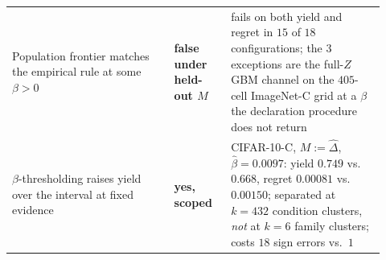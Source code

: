 \begin{center}
\begin{tabular}{@{}p{0.40\linewidth}p{0.14\linewidth}p{0.38\linewidth}@{}}
Population frontier matches the empirical rule at some $\beta>0$ & \textbf{false under held-out $M$} & fails on both yield and regret in $15$ of $18$ configurations; the $3$ exceptions are the full-$Z$ GBM channel on the $405$-cell ImageNet-C grid at a $\beta$ the declaration procedure does not return \\
$\beta$-thresholding raises yield over the interval at fixed evidence & \textbf{yes, scoped} & CIFAR-10-C, $M{:=}\widehat\Delta$, $\widehat\beta{=}0.0097$: yield $0.749$ vs.\ $0.668$, regret $0.00081$ vs.\ $0.00150$; separated at $k{=}432$ condition clusters, \emph{not} at $k{=}6$ family clusters; costs $18$ sign errors vs.\ $1$ \\
\bottomrule
\end{tabular}
\end{center}

